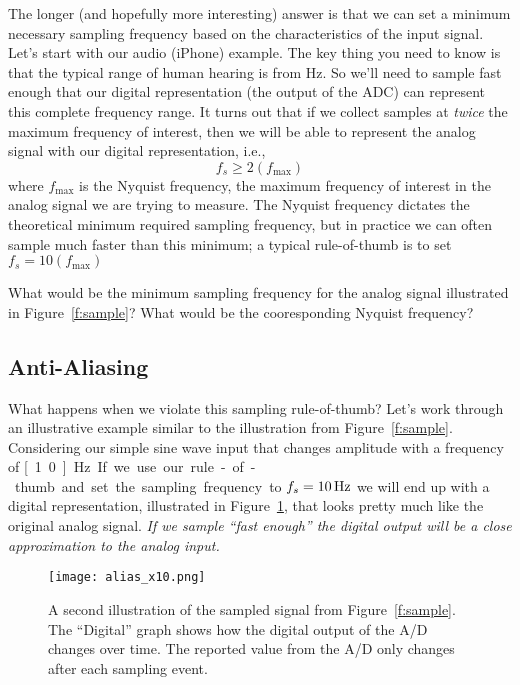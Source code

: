The longer (and hopefully more interesting) answer is that we can set a minimum necessary sampling frequency based on the characteristics of the input signal.  Let's start with our audio (iPhone) example.  The key thing you need to know is that the typical range of human hearing is from \unit[20--20,000]{Hz}.  So we'll need to sample fast enough that our digital representation (the output of the ADC) can represent this complete frequency range.  It turns out that if we collect samples at \emph{twice} the maximum frequency of interest, then we will be able to represent the analog signal with our digital representation, i.e.,
\[
f_s \geq 2\left(f_{\mathrm{max}}\right)
\]
where $f_{\mathrm{max}}$ is the \gls{Nyquist frequency}, the maximum frequency of interest in the analog signal we are trying to measure.  The Nyquist frequency dictates the theoretical minimum required sampling frequency, but in practice we can often sample much faster than this minimum; a typical rule-of-thumb is to set $f_s = 10(f_{\mathrm{max}})$

\begin{ex}
What would be the minimum sampling frequency for the analog signal illustrated in Figure~\ref{f:sample}?  What would be the cooresponding Nyquist frequency?
\end{ex}

\subsection{Anti-Aliasing}\label{s:alias}
What happens when we violate this sampling rule-of-thumb?  Let's work through an illustrative example similar to the illustration from Figure~\ref{f:sample}. Considering our simple sine wave input that changes amplitude with a frequency of \unit[1.0]{Hz}.  If we use our rule-of-thumb and set the sampling frequency to $f_s=\unit[10]{Hz}$ we will end up with a digital representation, illustrated in Figure~\ref{f:alias_x10}, that looks pretty much like the original analog signal.  \emph{If we sample ``fast enough'' the digital output will be a close approximation to the analog input.} 
\begin{figure}[hbt!]
\centering
\texttt{[image: alias\_x10.png]}
\caption{A second illustration of the sampled signal from Figure~\ref{f:sample}. The ``Digital'' graph shows how the digital output of the A/D changes over time.  The reported value from the A/D only changes after each sampling event.}
\label{f:alias_x10}
\end{figure}

